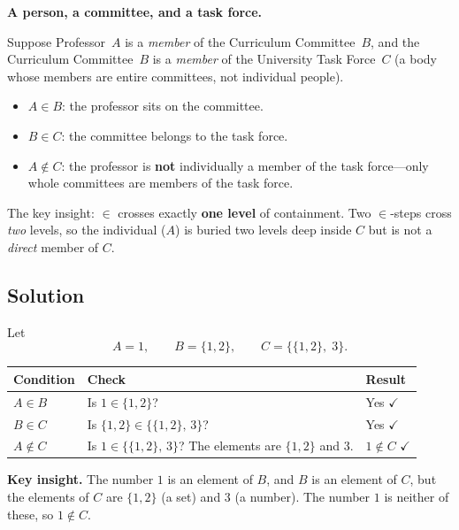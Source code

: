\documentclass[12pt, a4paper]{article}
\begin{document}
\begin{tcolorbox}[colback=yellow!5, colframe=stmtFrame!80!black, arc=2mm, left=5pt, right=5pt, top=5pt, bottom=5pt, title={\small Real-World Analogy: Level Jumps}]
\textbf{A person, a committee, and a task force.}

Suppose Professor~$A$ is a \emph{member} of the Curriculum Committee~$B$, and the Curriculum Committee~$B$ is a \emph{member} of the University Task Force~$C$ (a body whose members are entire committees, not individual people).

\begin{itemize}[nosep]
  \item $A \in B$: the professor sits on the committee.
  \item $B \in C$: the committee belongs to the task force.
  \item $A \notin C$: the professor is \textbf{not} individually a member of the task force---only whole committees are members of the task force.
\end{itemize}

The key insight: $\in$ crosses exactly \textbf{one level} of containment. Two $\in$-steps cross \emph{two} levels, so the individual ($A$) is buried two levels deep inside $C$ but is not a \emph{direct} member of $C$.
\end{tcolorbox}

\subsection*{Solution}
Let
\[
  A = 1, \qquad B = \{1, 2\}, \qquad C = \bigl\{\{1, 2\},\; 3\bigr\}.
\]

\begin{center}
\renewcommand{\arraystretch}{1.4}
\begin{tabular}{lll}
\toprule
\textbf{Condition} & \textbf{Check} & \textbf{Result} \\
\midrule
$A \in B$ & Is $1 \in \{1, 2\}$? & Yes $\checkmark$ \\
$B \in C$ & Is $\{1,2\} \in \bigl\{\{1,2\},\, 3\bigr\}$? & Yes $\checkmark$ \\
$A \notin C$ & Is $1 \in \bigl\{\{1,2\},\, 3\bigr\}$?
  The elements are $\{1,2\}$ and $3$. & $1 \notin C$ \;$\checkmark$ \\
\bottomrule
\end{tabular}
\end{center}

\textbf{Key insight.}\;
The number $1$ is an element of $B$, and $B$ is an element of $C$,
but the elements of $C$ are $\{1,2\}$ (a set) and $3$ (a number).
The number $1$ is neither of these, so $1 \notin C$.
\end{document}
